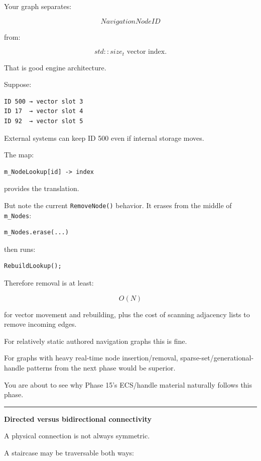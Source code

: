 Your graph separates:

\[
NavigationNodeID
\]

from:

\[
std::size_t\text{ vector index}.
\]

That is good engine architecture.

Suppose:

\begin{verbatim}
ID 500 → vector slot 3
ID 17  → vector slot 4
ID 92  → vector slot 5
\end{verbatim}

External systems can keep ID 500 even if internal storage moves.

The map:

\begin{verbatim}
m_NodeLookup[id] -> index
\end{verbatim}

provides the translation.

But note the current \texttt{RemoveNode()} behavior. It erases from the middle of \texttt{m\_Nodes}:

\begin{verbatim}
m_Nodes.erase(...)
\end{verbatim}

then runs:

\begin{verbatim}
RebuildLookup();
\end{verbatim}

Therefore removal is at least:

\[
O(N)
\]

for vector movement and rebuilding, plus the cost of scanning adjacency lists to remove incoming edges.

For relatively static authored navigation graphs this is fine.

For graphs with heavy real-time node insertion/removal, sparse-set/generational-handle patterns from the next phase would be superior.

You are about to see why Phase 15's ECS/handle material naturally follows this phase.

\begin{center}\rule{0.5\linewidth}{0.5pt}\end{center}

\textbf{Directed versus bidirectional connectivity}

A physical connection is not always symmetric.

A staircase may be traversable both ways:

